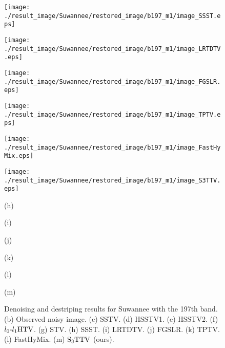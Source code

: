\begin{figure*}[t]
\begin{center}
		\vspace{2mm}
		
		\begin{minipage}{0.150\hsize}
			\centerline{\texttt{[image: ./result\_image/Suwannee/restored\_image/b197\_m1/image\_SSST.eps]}} %
		\end{minipage}
		\begin{minipage}{0.150\hsize}
			\centerline{\texttt{[image: ./result\_image/Suwannee/restored\_image/b197\_m1/image\_LRTDTV.eps]}} %
		\end{minipage}
		\begin{minipage}{0.150\hsize}
			\centerline{\texttt{[image: ./result\_image/Suwannee/restored\_image/b197\_m1/image\_FGSLR.eps]}} %
		\end{minipage}
		\begin{minipage}{0.150\hsize}
			\centerline{\texttt{[image: ./result\_image/Suwannee/restored\_image/b197\_m1/image\_TPTV.eps]}} %
		\end{minipage}
		\begin{minipage}{0.150\hsize}
			\centerline{\texttt{[image: ./result\_image/Suwannee/restored\_image/b197\_m1/image\_FastHyMix.eps]}} %
		\end{minipage}
		\begin{minipage}{0.150\hsize}
			\centerline{\texttt{[image: ./result\_image/Suwannee/restored\_image/b197\_m1/image\_S3TTV.eps]}} %
		\end{minipage}
		
		\vspace{1mm}
		
		
		\begin{minipage}{0.150\hsize}
			\centerline{\small{(h)}}
		\end{minipage}
		\begin{minipage}{0.150\hsize}
			\centerline{\small{(i)}}
		\end{minipage}
		\begin{minipage}{0.150\hsize}
			\centerline{\small{(j)}}
		\end{minipage}
		\begin{minipage}{0.150\hsize}
			\centerline{\small{(k)}}
		\end{minipage}
		\begin{minipage}{0.150\hsize}
			\centerline{\small{(l)}}
		\end{minipage}
		\begin{minipage}{0.150\hsize}
			\centerline{\small{(m)}}
		\end{minipage}
	\end{center}
	
	\vspace{-3mm}
	\caption{Denoising and destriping results for Suwannee with the 197th band. (b) Observed noisy image. (c) SSTV. (d) HSSTV1. (e) HSSTV2. (f) ${l_{0}\text{-}l_{1}\text{HTV}}$. (g) STV. (h) SSST. (i) LRTDTV. (j) FGSLR. (k) TPTV. (l) FastHyMix. (m) ${\text{S}_{3} \text{TTV}}$ (ours).}
	\label{fig:result_image_Suwannee}
\end{figure*}